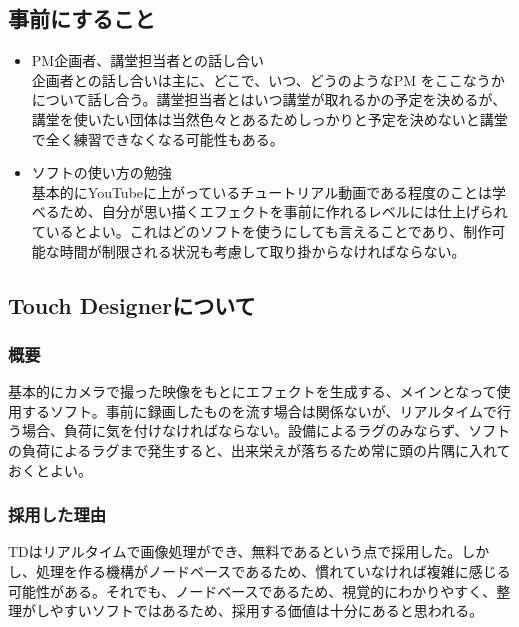 \documentclass[dvipdfmx,jb5]{jarticle}
\begin{document}
\subsection{事前にすること}
\begin{itemize}
  \item PM企画者、講堂担当者との話し合い\\
  企画者との話し合いは主に、どこで、いつ、どうのようなPM をここなうかについて話し合う。講堂担当者とはいつ講堂が取れるかの予定を決めるが、講堂を使いたい団体は当然色々とあるためしっかりと予定を決めないと講堂で全く練習できなくなる可能性もある。
  \item ソフトの使い方の勉強\\
  基本的にYouTubeに上がっているチュートリアル動画である程度のことは学べるため、自分が思い描くエフェクトを事前に作れるレベルには仕上げられているとよい。これはどのソフトを使うにしても言えることであり、制作可能な時間が制限される状況も考慮して取り掛からなければならない。
\end{itemize}

\subsection{Touch Designerについて}
\subsubsection{概要}
基本的にカメラで撮った映像をもとにエフェクトを生成する、メインとなって使用するソフト。事前に録画したものを流す場合は関係ないが、リアルタイムで行う場合、負荷に気を付けなければならない。設備によるラグのみならず、ソフトの負荷によるラグまで発生すると、出来栄えが落ちるため常に頭の片隅に入れておくとよい。

\subsubsection{採用した理由}
TDはリアルタイムで画像処理ができ、無料であるという点で採用した。しかし、処理を作る機構がノードベースであるため、慣れていなければ複雑に感じる可能性がある。それでも、ノードベースであるため、視覚的にわかりやすく、整理がしやすいソフトではあるため、採用する価値は十分にあると思われる。
\end{document}
